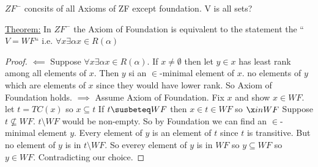 \dfn $ZF^-$ concsits of all Axioms of ZF except foundation.
\dfn V is all sets?

\underline{Theorem:} In $ZF^-$ the Axiom of Foundation is equivalent to the statement the ``$V = WF$``
i.e. $\forall x \exists \alpha x \in R(\alpha)$

\begin{proof}
    $\impliedby$ Suppose $\forall x \exists \alpha x \in R(\alpha)$.
    If $x \neq \emptyset$ then let $y \in x$ has least rank among all elements of $x$.
    Then $y$ si an $\in$-minimal element of $x$.
    no elements of $y$ which are elements of $x$ since they would have lower rank.
    So Axiom of Foundation holds.
    $\implies$ Assume Axiom of Foundation.
    Fix $x$ and show $x \in WF$.
    let $t = TC(x)$ so $x \subseteq t$
    If $t \susbeteq WF$ then $x \in t \in WF$ so $\x in WF$
    Suppose $t \nsubseteq WF$.
    $t \setminus WF$ would be non-empty.
    So by Foundation we can find an $\in$-minimal element $y$.
    Every element of $y$ is an element of $t$ since $t$ is transitive.
    But no element of $y$ is in $t \setminus WF$.
    So everey element of $y$ is in $WF$ so $y \subseteq WF$ so $y \in WF$.
    Contradicting our choice.
    \end{proof}




